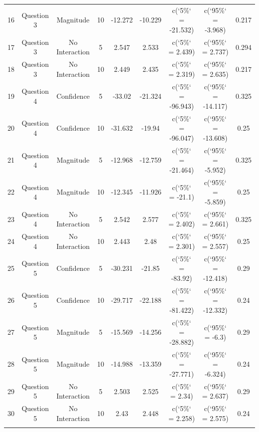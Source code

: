 \begin{table}[!htbp]
\begin{tabular}{@{\extracolsep{5pt}} ccccccccc}
16 & Question 3 & Magnitude & 10 & -12.272 & -10.229 & c(`5\%` = -21.532) & c(`95\%` = -3.968) & 0.217 \\ 
17 & Question 3 & No Interaction & 5 & 2.547 & 2.533 & c(`5\%` = 2.439) & c(`95\%` = 2.737) & 0.294 \\ 
18 & Question 3 & No Interaction & 10 & 2.449 & 2.435 & c(`5\%` = 2.319) & c(`95\%` = 2.635) & 0.217 \\ 
19 & Question 4 & Confidence & 5 & -33.02 & -21.324 & c(`5\%` = -96.943) & c(`95\%` = -14.117) & 0.325 \\ 
20 & Question 4 & Confidence & 10 & -31.632 & -19.94 & c(`5\%` = -96.047) & c(`95\%` = -13.608) & 0.25 \\ 
21 & Question 4 & Magnitude & 5 & -12.968 & -12.759 & c(`5\%` = -21.464) & c(`95\%` = -5.952) & 0.325 \\ 
22 & Question 4 & Magnitude & 10 & -12.345 & -11.926 & c(`5\%` = -21.1) & c(`95\%` = -5.859) & 0.25 \\ 
23 & Question 4 & No Interaction & 5 & 2.542 & 2.577 & c(`5\%` = 2.402) & c(`95\%` = 2.661) & 0.325 \\ 
24 & Question 4 & No Interaction & 10 & 2.443 & 2.48 & c(`5\%` = 2.301) & c(`95\%` = 2.557) & 0.25 \\ 
25 & Question 5 & Confidence & 5 & -30.231 & -21.85 & c(`5\%` = -83.92) & c(`95\%` = -12.418) & 0.29 \\ 
26 & Question 5 & Confidence & 10 & -29.717 & -22.188 & c(`5\%` = -81.422) & c(`95\%` = -12.332) & 0.24 \\ 
27 & Question 5 & Magnitude & 5 & -15.569 & -14.256 & c(`5\%` = -28.882) & c(`95\%` = -6.3) & 0.29 \\ 
28 & Question 5 & Magnitude & 10 & -14.988 & -13.359 & c(`5\%` = -27.771) & c(`95\%` = -6.324) & 0.24 \\ 
29 & Question 5 & No Interaction & 5 & 2.503 & 2.525 & c(`5\%` = 2.34) & c(`95\%` = 2.637) & 0.29 \\ 
30 & Question 5 & No Interaction & 10 & 2.43 & 2.448 & c(`5\%` = 2.258) & c(`95\%` = 2.575) & 0.24 \\ 
\hline \\[-1.8ex] 
\end{tabular} 
\end{table} 

